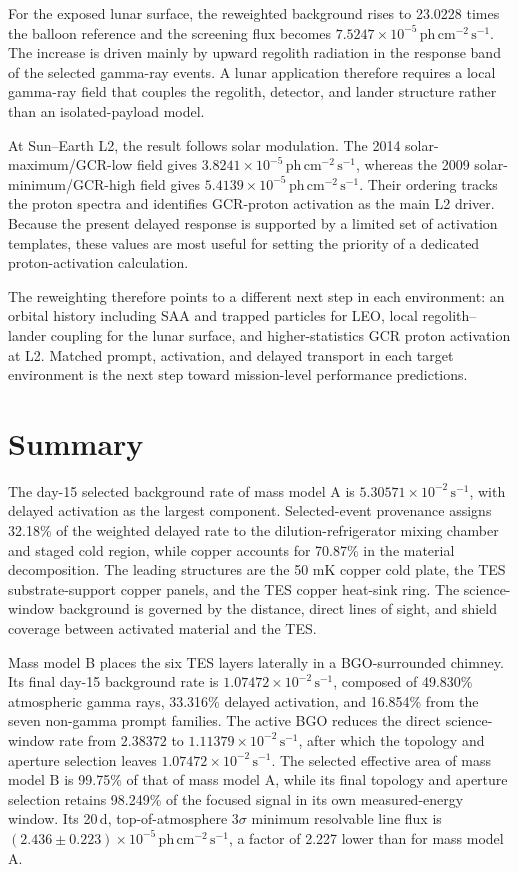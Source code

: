 \documentclass[11pt]{article}
\newcommand{\phcms}{\ensuremath{\,\mathrm{ph\,cm^{-2}\,s^{-1}}}}
\newcommand{\cps}{\ensuremath{\,\mathrm{s^{-1}}}}
\begin{document}
For the exposed lunar surface, the reweighted background rises to 23.0228 times
the balloon reference and the screening flux becomes
$7.5247\times10^{-5}\phcms$. The increase is driven mainly by upward regolith
radiation in the response band of the selected gamma-ray events. A lunar
application therefore requires a local gamma-ray field that couples the
regolith, detector, and lander structure rather than an isolated-payload model.

At Sun--Earth L2, the result follows solar modulation. The 2014
solar-maximum/GCR-low field gives $3.8241\times10^{-5}\phcms$, whereas the 2009
solar-minimum/GCR-high field gives $5.4139\times10^{-5}\phcms$. Their ordering
tracks the proton spectra and identifies GCR-proton activation as the main L2
driver. Because the present delayed response is supported by a limited set of
activation templates, these values are most useful for setting the priority of
a dedicated proton-activation calculation.

The reweighting therefore points to a different next step in each environment:
an orbital history including SAA and trapped particles for LEO, local
regolith--lander coupling for the lunar surface, and higher-statistics GCR
proton activation at L2. Matched prompt, activation, and delayed transport in
each target environment is the next step toward mission-level performance
predictions.

\FloatBarrier

\section{Summary}
\label{sec:summary}

The day-15 selected background rate of mass model A is
$5.30571\times10^{-2}\cps$, with delayed activation as the largest component.
Selected-event provenance assigns 32.18\% of the weighted delayed rate to the
dilution-refrigerator mixing chamber and staged cold region, while copper
accounts for 70.87\% in the material decomposition. The leading structures are the
50 mK copper cold plate, the TES substrate-support copper panels, and the TES
copper heat-sink ring. The science-window background is governed by the
distance, direct lines of sight, and shield coverage between activated material
and the TES.

Mass model B places the six TES layers laterally in a BGO-surrounded chimney.
Its final day-15 background rate is $1.07472\times10^{-2}\cps$, composed of
49.830\% atmospheric gamma rays, 33.316\% delayed activation, and
16.854\% from the seven non-gamma prompt families. The active BGO reduces the
direct science-window rate from $2.38372$ to
$1.11379\times10^{-2}\cps$, after which the topology and aperture selection
leaves $1.07472\times10^{-2}\cps$. The selected effective area of mass model B
is 99.75\% of that of mass model A, while its final topology and aperture
selection retains 98.249\% of the focused signal in its own measured-energy
window. Its 20\,d, top-of-atmosphere $3\sigma$ minimum resolvable line flux is
$(2.436\pm0.223)\times10^{-5}\phcms$, a factor of 2.227 lower than for mass
model A.
\end{document}
